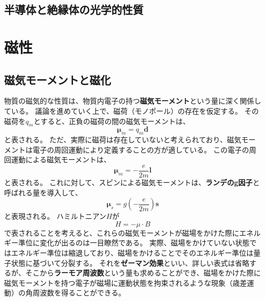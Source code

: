 \documentclass[a4paper]{jsreport}
\begin{document}
        \section{半導体と絶縁体の光学的性質}

    \chapter{磁性}
        \section{磁気モーメントと磁化}
            物質の磁気的な性質は、物質内電子の持つ\textbf{磁気モーメント}という量に深く関係している。
            議論を進めていく上で、磁荷（モノポール）の存在を仮定する。
            その磁荷を$q_m$とすると、正負の磁荷の間の磁気モーメントは、
            \begin{equation}
                \boldsymbol{\mu}_m = q_m \boldsymbol{d}
            \end{equation}
            と表される。
            ただ、実際に磁荷は存在していないと考えられており、磁気モーメントは電子の周回運動により定義することの方が適している。
            この電子の周回運動による磁気モーメントは、
            \begin{equation}
                \boldsymbol{\mu}_m = - \frac{e}{2m} \boldsymbol{l}
            \end{equation}
            と表される。
            これに対して、スピンによる磁気モーメントは、\textbf{ランデのg因子}と呼ばれる量を導入して、
            \begin{equation}
                \boldsymbol{\mu}_s = g \left(- \frac{e}{2m} \right) \boldsymbol{s}
            \end{equation}
            と表現される。
            ハミルトニアン$H$が
            \begin{equation}
                H = - \mu \cdot B
            \end{equation}
            で表されることを考えると、これらの磁気モーメントが磁場をかけた際にエネルギー準位に変化が出るのは一目瞭然である。
            実際、磁場をかけていない状態ではエネルギー準位は縮退しており、磁場をかけることでそのエネルギー準位は量子状態に基づいて分裂する。
            それを\textbf{ゼーマン効果}といい、詳しい表式は省略するが、そこから\textbf{ラーモア周波数}という量も求めることができ、磁場をかけた際に磁気モーメントを持つ電子が磁場に運動状態を拘束されるような現象（歳差運動）の角周波数を得ることができる。\par
\end{document}
